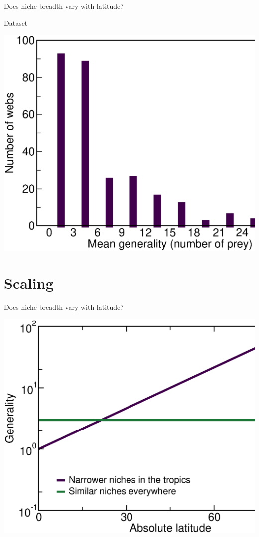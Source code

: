 \documentclass{beamer}
\begin{document}
  \begin{frame}{Does niche breadth vary with latitude?}

    \begin{block}{Dataset}
    \begin{center}
      \includegraphics*[width=.75\textwidth]{Figures/results/generality_hist.eps}

    \end{center}
    \end{block}

  \end{frame}


\section*{Scaling}
  \begin{frame}{Does niche breadth vary with latitude?}

    \begin{center}
      \includegraphics*[width=.8\textwidth]{Figures/results/Gen_vs_lat_simulated.eps}
    \end{center}

  \end{frame}
\end{document}
